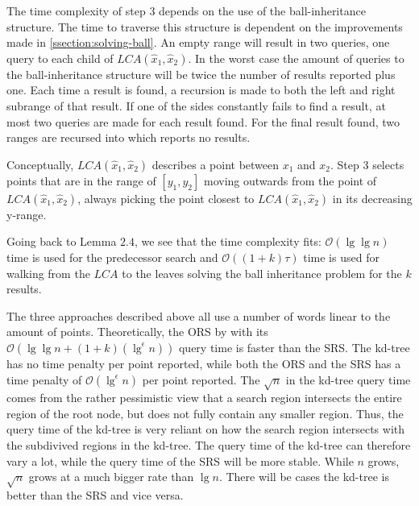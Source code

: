 The time complexity of step $3$ depends on the use of the ball-inheritance structure. The time to traverse this structure is dependent on the improvements made in \ref{ssection:solving-ball}. An empty range will result in two queries, one query to each child of $LCA(\hat{x}_1, \hat{x}_2)$. In the worst case the amount of queries to the ball-inheritance structure will be twice the number of results reported plus one. Each time a result is found, a recursion is made to both the left and right subrange of that result. If one of the sides constantly fails to find a result, at most two queries are made for each result found. For the final result found, two ranges are recursed into which reports no results.

Conceptually, $LCA(\hat{x}_1, \hat{x}_2)$ describes a point between $x_1$ and $x_2$. Step $3$ selects points that are in the range of $[y_1, y_2]$ moving outwards from the point of $LCA(\hat{x}_1, \hat{x}_2)$, always picking the point closest to $LCA(\hat{x}_1, \hat{x}_2)$ in its decreasing y-range. 

Going back to Lemma $2.4$, we see that the time complexity fits: $\mathcal{O}(\lg \lg n)$ time is used for the predecessor search and $\mathcal{O}((1+k)\tau)$ time is used for walking from the $LCA$ to the leaves solving the ball inheritance problem for the $k$ results.

The three approaches described above all use a number of words linear to the amount of points. Theoretically, the ORS by \citet{chanetal} with its $\mathcal{O}(\lg \lg n + (1+k)(\lg^\epsilon n))$ query time is faster than the SRS. The kd-tree has no time penalty per point reported, while both the ORS and the SRS has a time penalty of $\mathcal{O}(\lg^\epsilon n)$ per point reported. The $\sqrt{n}$ in the kd-tree query time comes from the rather pessimistic view that a search region intersects the entire region of the root node, but does not fully contain any smaller region. Thus, the query time of the kd-tree is very reliant on how the search region intersects with the subdivived regions in the kd-tree. The query time of the kd-tree can therefore vary a lot, while the query time of the SRS will be more stable. While $n$ grows, $\sqrt{n}$ grows at a much bigger rate than $\lg n$. There will be cases the kd-tree is better than the SRS and vice versa. 




